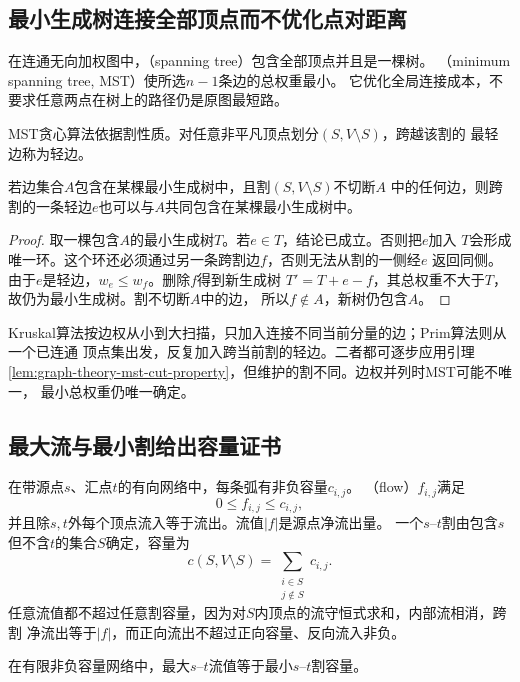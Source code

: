 \subsection{最小生成树连接全部顶点而不优化点对距离}

在连通无向加权图中，（spanning tree）包含全部顶点并且是一棵树。
（minimum spanning tree, MST）使所选\(n-1\)条边的总权重最小。
它优化全局连接成本，不要求任意两点在树上的路径仍是原图最短路。

MST贪心算法依据割性质。对任意非平凡顶点划分\((S,V\setminus S)\)，跨越该割的
最轻边称为轻边。
\begin{lemma}[最小生成树的割性质]
  \label{lem:graph-theory-mst-cut-property}
  若边集合\(A\)包含在某棵最小生成树中，且割\((S,V\setminus S)\)不切断\(A\)
  中的任何边，则跨割的一条轻边\(e\)也可以与\(A\)共同包含在某棵最小生成树中。
\end{lemma}

\begin{proof}
取一棵包含\(A\)的最小生成树\(T\)。若\(e\in T\)，结论已成立。否则把\(e\)加入
\(T\)会形成唯一环。这个环还必须通过另一条跨割边\(f\)，否则无法从割的一侧经\(e\)
返回同侧。由于\(e\)是轻边，\(w_e\leq w_f\)。删除\(f\)得到新生成树
\(T'=T+e-f\)，其总权重不大于\(T\)，故仍为最小生成树。割不切断\(A\)中的边，
所以\(f\notin A\)，新树仍包含\(A\)。
\end{proof}

Kruskal算法按边权从小到大扫描，只加入连接不同当前分量的边；Prim算法则从一个已连通
顶点集出发，反复加入跨当前割的轻边。二者都可逐步应用引理
\ref{lem:graph-theory-mst-cut-property}，但维护的割不同。边权并列时MST可能不唯一，
最小总权重仍唯一确定。

\subsection{最大流与最小割给出容量证书}

在带源点\(s\)、汇点\(t\)的有向网络中，每条弧有非负容量\(c_{i,j}\)。
（flow）\(f_{i,j}\)满足
\[
  0\leq f_{i,j}\leq c_{i,j},
\]
并且除\(s,t\)外每个顶点流入等于流出。流值\(|f|\)是源点净流出量。
一个\(s\)--\(t\)割由包含\(s\)但不含\(t\)的集合\(S\)确定，容量为
\[
  c(S,V\setminus S)=
  \sum_{\substack{i\in S\\j\notin S}}c_{i,j}.
\]
任意流值都不超过任意割容量，因为对\(S\)内顶点的流守恒式求和，内部流相消，跨割
净流出等于\(|f|\)，而正向流出不超过正向容量、反向流入非负。

\begin{theorem}[最大流最小割定理]
  \label{thm:graph-theory-max-flow-min-cut}
  在有限非负容量网络中，最大\(s\)--\(t\)流值等于最小\(s\)--\(t\)割容量。
\end{theorem}

